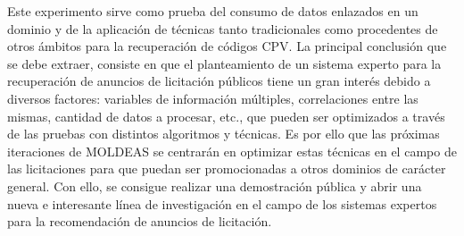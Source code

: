 \begin{itemize}
Este experimento sirve como prueba del consumo de datos enlazados en un dominio y de la aplicación de técnicas 
tanto tradicionales como procedentes de otros ámbitos para la recuperación de códigos \gls{CPV}. La principal conclusión 
que se debe extraer, consiste en que el planteamiento de un sistema experto para la recuperación de anuncios de licitación 
públicos tiene un gran interés debido a diversos factores: variables de información múltiples, correlaciones entre las 
mismas, cantidad de datos a procesar, etc., que pueden ser optimizados a través de las pruebas con distintos algoritmos 
y técnicas. Es por ello que las próximas iteraciones de MOLDEAS se centrarán en optimizar estas técnicas en el campo 
de las licitaciones para que puedan ser promocionadas a otros dominios de carácter general. Con ello, se consigue 
realizar una demostración pública y abrir una nueva e interesante línea de investigación en el campo de los sistemas 
expertos para la recomendación de anuncios de licitación.

\end{itemize}

\clearpage